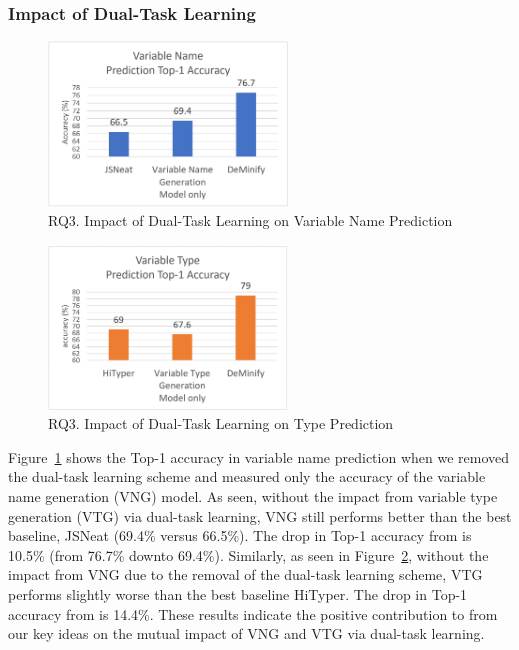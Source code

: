 \subsubsection{Impact of Dual-Task Learning}
\label{sec:dual-task-result}


\begin{figure}[t]%
\begin{center}
\includegraphics[width=2.5in]{figures/dual-task-result-11}
\vspace{-8pt}
\caption{RQ3. Impact of Dual-Task Learning on Variable Name Prediction}
\label{dual-task-result-1}
\end{center}
\end{figure}

\begin{figure}[t]%
\begin{center}
\includegraphics[width=2.5in]{figures/dual-task-result-22}
\vspace{-8pt}
\caption{RQ3. Impact of Dual-Task Learning on Type Prediction}
\label{dual-task-result-2}
\end{center}
\end{figure}

Figure~\ref{dual-task-result-1} shows the Top-1 accuracy in variable
name prediction when we removed the dual-task learning scheme and
measured only the accuracy of the variable name generation (VNG)
model.  As seen, without the impact from variable type generation
(VTG) via dual-task learning, VNG still performs better than the best
baseline, JSNeat (69.4\% versus 66.5\%). The drop in Top-1 accuracy
from {\tool} is 10.5\% (from 76.7\% downto 69.4\%). Similarly, as seen
in Figure~\ref{dual-task-result-2}, without the impact from VNG due to
the removal of the dual-task learning scheme, VTG performs slightly
worse than the best baseline HiTyper. The drop in Top-1 accuracy from
{\tool} is 14.4\%.  These results indicate the positive contribution to {\tool}
from our key ideas on the mutual impact of VNG and VTG via dual-task
learning.
